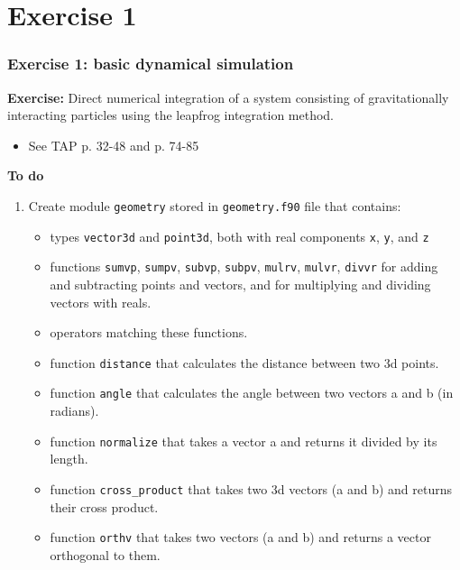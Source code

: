 
\subtitle{Course exercise 1: basic dynamical simulation}



\begin{frame}
  \titlepage
\end{frame}

\section{Exercise 1}

\begin{frame}
  \frametitle{Exercise 1: basic dynamical simulation}

  \textbf{Exercise:} Direct numerical integration of a system consisting of gravitationally interacting particles using the leapfrog integration method.
  \begin{itemize}
   \item See TAP p. 32-48 and p. 74-85
  \end{itemize}


  \textbf{To do}
  \begin{enumerate}
   \item Create module \texttt{geometry} stored in \texttt{geometry.f90} file that contains:
   \begin{itemize}
    \item types \texttt{vector3d} and \texttt{point3d}, both with real components \texttt{x}, \texttt{y}, and \texttt{z}
    \item functions \texttt{sumvp}, \texttt{sumpv}, \texttt{subvp}, \texttt{subpv}, \texttt{mulrv}, \texttt{mulvr}, \texttt{divvr} for adding and subtracting points and vectors, and for multiplying and dividing vectors with reals.
    \item operators matching these functions.
    \item function \texttt{distance} that calculates the distance between two 3d points.
    \item function \texttt{angle} that calculates the angle between two vectors a and b (in radians).
    \item function \texttt{normalize} that takes a vector a and returns it divided by its length.
    \item function \texttt{cross\_product} that takes two 3d vectors (a and b) and returns their cross product.
    \item function \texttt{orthv} that takes two vectors (a and b) and returns a vector orthogonal to them.
   \end{itemize}
  \end{enumerate}
\end{frame}



